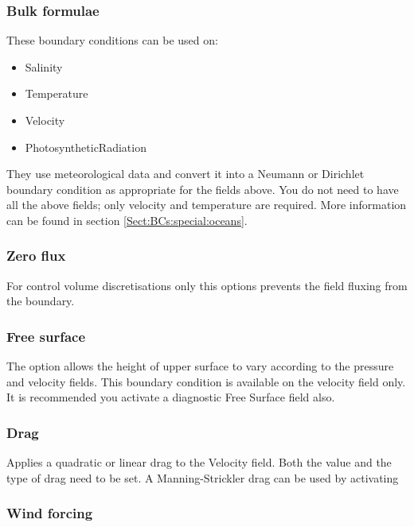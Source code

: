 \subsubsection{Bulk formulae}

These boundary conditions can be used on:
\begin{itemize}
\item Salinity
\item Temperature
\item Velocity
\item PhotosyntheticRadiation
\end{itemize}

They use meteorological data and convert it into a Neumann or Dirichlet boundary condition
as appropriate for the fields above. You do not need to have all the above fields; only 
velocity and temperature are required. More information can be found in section \ref{Sect:BCs:special:oceans}.

\subsubsection{Zero flux}

For control volume discretisations only this options prevents the field fluxing from the boundary.

\subsubsection{Free surface}

The  option allows the height of upper surface to vary according
to the pressure and velocity fields. This boundary condition is available on the velocity field only. It is
recommended you activate a diagnostic Free Surface field also.

\subsubsection{Drag}

Applies a quadratic or linear drag to the Velocity field. Both the value and the type of drag need to be set. A Manning-Strickler drag can be used by activating 

\subsubsection{Wind forcing}

